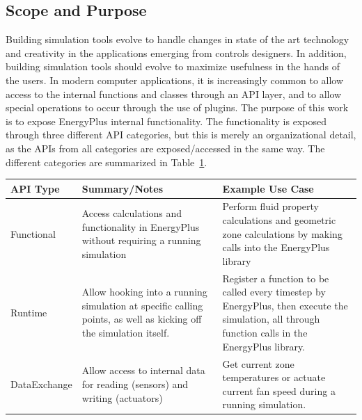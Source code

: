 \documentclass[5p]{elsarticle}
\begin{document}
  \subsection{Scope and Purpose}
Building simulation tools evolve to handle changes in state of the art technology and creativity in the applications emerging from controls designers.  In addition, building simulation tools should evolve to maximize usefulness in the hands of the users.  In modern computer applications, it is increasingly common to allow access to the internal functions and classes through an API layer, and to allow special operations to occur through the use of plugins.  The purpose of this work is to expose EnergyPlus internal functionality.  The functionality is exposed through three different API categories, but this is merely an organizational detail, as the APIs from all categories are exposed/accessed in the same way.  The different categories are summarized in Table~\ref{table:api:uses:classes}.

\begin{table}
\begin{center}
\begin{tabular}{@{}p{1.25in}p{2.5in}p{2.5in}@{}}
\toprule
API Type     & Summary/Notes & Example Use Case                                                                                                                                  \\ 
\midrule
Functional   & Access calculations and functionality in EnergyPlus without requiring a running simulation & Perform fluid property calculations and geometric zone calculations by making calls into the EnergyPlus library \\
Runtime      & Allow hooking into a running simulation at specific calling points, as well as kicking off the simulation itself. & Register a function to be called every timestep by EnergyPlus, then execute the simulation, all through function calls in the EnergyPlus library. \\
DataExchange & Allow access to internal data for reading (sensors) and writing (actuators) & Get current zone temperatures or actuate current fan speed during a running simulation.                                                           \\ 
\bottomrule
\end{tabular}
\label{table:api:uses:classes}
\end{center}
\end{table}
\end{document}
